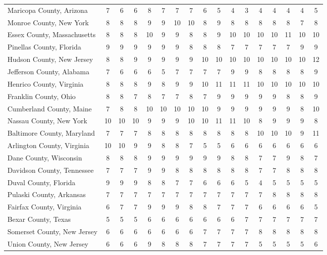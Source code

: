 \begin{landscape}
\begin{longtable}{lcccccccccccccccc}
Maricopa County, Arizona & 7 & 6 & 6 & 8 & 7 & 7 & 7 & 6 & 5 & 4 & 3 & 4 & 4 & 4 & 4 & 5 \\
Monroe County, New York & 8 & 8 & 8 & 9 & 9 & 10 & 10 & 8 & 9 & 8 & 8 & 8 & 8 & 8 & 7 & 8 \\
Essex County, Massachusetts & 8 & 8 & 8 & 10 & 9 & 9 & 8 & 8 & 9 & 10 & 10 & 10 & 10 & 11 & 10 & 10 \\
Pinellas County, Florida & 9 & 9 & 9 & 9 & 9 & 9 & 8 & 8 & 8 & 7 & 7 & 7 & 7 & 7 & 9 & 9 \\
Hudson County, New Jersey & 8 & 8 & 9 & 9 & 9 & 9 & 9 & 10 & 10 & 10 & 10 & 10 & 10 & 10 & 10 & 12 \\
Jefferson County, Alabama & 7 & 6 & 6 & 6 & 5 & 7 & 7 & 7 & 7 & 9 & 9 & 8 & 8 & 8 & 8 & 9 \\
Henrico County, Virginia & 8 & 8 & 8 & 9 & 8 & 9 & 9 & 10 & 11 & 11 & 11 & 10 & 10 & 10 & 10 & 10 \\
Franklin County, Ohio & 8 & 8 & 7 & 8 & 7 & 7 & 8 & 7 & 9 & 9 & 9 & 9 & 9 & 8 & 8 & 9 \\
Cumberland County, Maine & 7 & 8 & 8 & 10 & 10 & 10 & 10 & 10 & 9 & 9 & 9 & 9 & 9 & 9 & 8 & 10 \\
Nassau County, New York & 10 & 10 & 10 & 9 & 9 & 9 & 10 & 10 & 11 & 11 & 10 & 8 & 9 & 9 & 9 & 8 \\
Baltimore County, Maryland & 7 & 7 & 7 & 8 & 8 & 8 & 8 & 8 & 8 & 8 & 8 & 10 & 10 & 10 & 9 & 11 \\
Arlington County, Virginia & 10 & 10 & 9 & 9 & 8 & 8 & 7 & 5 & 5 & 6 & 6 & 6 & 6 & 6 & 6 & 6 \\
Dane County, Wisconsin & 8 & 8 & 8 & 9 & 9 & 9 & 9 & 9 & 9 & 8 & 8 & 7 & 7 & 9 & 8 & 7 \\
Davidson County, Tennessee & 7 & 7 & 7 & 9 & 9 & 8 & 8 & 8 & 8 & 8 & 8 & 7 & 7 & 8 & 8 & 8 \\
Duval County, Florida & 9 & 9 & 9 & 8 & 8 & 7 & 7 & 6 & 6 & 6 & 5 & 4 & 5 & 5 & 5 & 5 \\
Pulaski County, Arkansas & 7 & 7 & 7 & 7 & 7 & 7 & 7 & 7 & 7 & 7 & 7 & 7 & 8 & 8 & 8 & 8 \\
Fairfax County, Virginia & 6 & 7 & 7 & 9 & 9 & 9 & 8 & 8 & 7 & 7 & 7 & 6 & 6 & 6 & 6 & 5 \\
Bexar County, Texas & 5 & 5 & 5 & 6 & 6 & 6 & 6 & 6 & 6 & 6 & 7 & 7 & 7 & 7 & 7 & 7 \\
Somerset County, New Jersey & 6 & 6 & 6 & 6 & 6 & 6 & 6 & 7 & 7 & 7 & 7 & 8 & 8 & 8 & 8 & 8 \\
Union County, New Jersey & 6 & 6 & 6 & 9 & 8 & 8 & 8 & 7 & 7 & 7 & 7 & 5 & 5 & 5 & 5 & 6 \\

\end{longtable}
\end{landscape}
